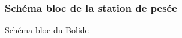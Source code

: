 \begin{figure}[hbtp]
\subsubsection{Schéma bloc de la station de pesée}
\caption{Schéma bloc du Bolide}
\centering
{}
\end{figure}
\vfill
\pagebreak

